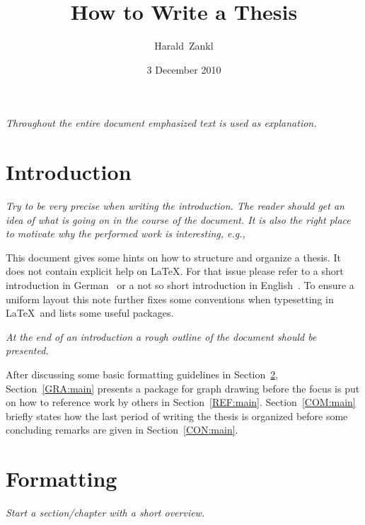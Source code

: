 \documentclass{howto}
\begin{document}
\title{How to Write a Thesis}
\author{Harald~Zankl}
\date{3 December 2010}
\maketitle
\newpage
\tableofcontents
\emph{Throughout the entire document emphasized text is used as
explanation.}

\section{Introduction}
\emph{Try to be very precise when writing the introduction. The reader
should get an idea of what is going on in the course of the document.
It is also the right
place to motivate why the performed work is interesting, e.g.,}

This document gives some hints on how to structure and organize a thesis.
It does not contain explicit help on \LaTeX. For that
issue  please refer to a short introduction in German~\cite{LAT01} or a not
so short introduction in English~\cite{LAT02}. To ensure a uniform layout
this note further fixes some conventions when typesetting in \LaTeX\ and
lists some useful packages.

\emph{At the end of an introduction a rough outline of the document should
be presented.}

After discussing some basic formatting guidelines in
Section~\ref{FOR:main}, Section~\ref{GRA:main} presents a package for graph
drawing before the focus is put on how to reference work
by others in Section~\ref{REF:main}. Section~\ref{COM:main} briefly states
how the last period of writing the thesis is organized before some
concluding remarks are given in Section~\ref{CON:main}.

\section{Formatting}
\label{FOR:main}

\emph{Start a section/chapter with a short overview.}
\end{document}
